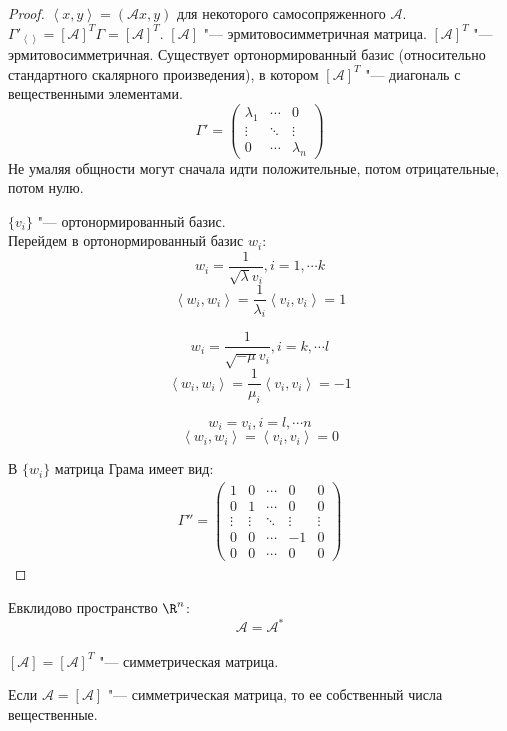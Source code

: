 \begin{proof}
	$\left<x, y\right> = (\mathcal Ax, y)$ для некоторого самосопряженного $\mathcal A$.
	$\Gamma'_{\left<\right>} = [\mathcal A]^T\Gamma = [\mathcal A]^T$.
	$[\mathcal A]$ "--- эрмитовосимметричная матрица.
	$[\mathcal A]^T$ "---эрмитовосимметричная.
	Существует ортонормированный базис (относительно стандартного скалярного произведения),
	в котором 
	$[\mathcal A]^T$ "--- диагональ с вещественными элементами.
	\[
		\Gamma' = \begin{pmatrix}
			\lambda_1 & \cdots & 0 \\
			\vdots & \ddots & \vdots \\
			0 & \cdots & \lambda_n
		\end{pmatrix}
	\]
	Не умаляя общности могут сначала идти положительные, потом отрицательные, потом нулю.

	$\{v_i\}$ "--- ортонормированный базис.\\
	Перейдем в ортонормированный базис $w_i:$
	$$w_i = \frac{1}{\sqrt{\lambda}v_i}, i = 1, \cdots k$$
	$$\left<w_i, w_i\right> = \frac1{\lambda_i} \left<v_i, v_i\right> = 1$$
	
	$$w_i = \frac{1}{\sqrt{-\mu}v_i}, i = k, \cdots l$$
	$$\left<w_i, w_i\right> = \frac1{\mu_i} \left<v_i, v_i\right> = -1$$
	
	$$w_i = v_i, i = l, \cdots n$$
	$$\left<w_i, w_i\right> = \left<v_i, v_i \right> = 0$$
	
	В $\{w_i\}$ матрица Грама имеет вид:
	\begin{gather*}
		\Gamma'' = \begin{pmatrix}
			1 & 0 &\cdots & 0 & 0 \\
			0 & 1 &\cdots & 0 & 0 \\
			\vdots&\vdots &\ddots&\vdots&\vdots\\
			0 & 0 &\cdots & -1 & 0 \\
			0 & 0 &\cdots & 0 & 0
		\end{pmatrix}
	\end{gather*}
\end{proof}

Евклидово пространство $\R^n$:
\[ \mathcal A = \mathcal{A}^* \] \\
$[\mathcal A] = [\mathcal A]^T$  "--- симметрическая матрица.

\begin{lemma}
	Если $\mathcal A = [\mathcal A]$ "--- симметрическая матрица, то ее собственный числа вещественные.
\end{lemma}

